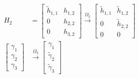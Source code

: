 \begin{align*}
    H_2             & = \begin{bmatrix}
                            \tilde{h}_{1,1} & h_{1,2} \\
                            0               & h_{2,2} \\
                            0               & h_{3,2}
                        \end{bmatrix} \xrightarrow{\Omega_2} \begin{bmatrix}
                                                                 \tilde{h}_{1,1} & \tilde{h}_{1,2} \\
                                                                 0               & \tilde{h}_{2,2} \\
                                                                 0               & 0
                                                             \end{bmatrix} \\
    \begin{bmatrix}
        \gamma_1 \\
        \gamma_2 \\
        \gamma_3
    \end{bmatrix} & \xrightarrow{\Omega_2} \begin{bmatrix}
                                               \gamma_1         \\
                                               \tilde{\gamma}_2 \\
                                               \tilde{\gamma}_3
                                           \end{bmatrix}
\end{align*}

